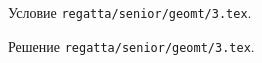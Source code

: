\problem
Условие \texttt{regatta/senior/geomt/3.tex}.

\solution Решение \texttt{regatta/senior/geomt/3.tex}.
\endproblem
